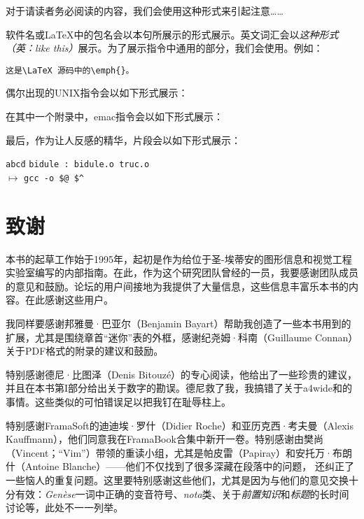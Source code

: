 \begin{exclamation}
对于请读者务必阅读的内容，我们会使用这种形式来引起注意……
\end{exclamation}

\textsf{软件名}或\LaTeX 中的\textsf{包名}会以本句所展示的形式展示。英文词汇会以\emph{这种形式（英：like this）}展示。为了展示指令中通用的部分，我们会使用。例如：

\begin{dmd}
\verb|这是\LaTeX 源码中的\emph{|\verb|}。|
\end{dmd}

偶尔出现的UNIX指令会以如下形式展示：


在其中一个附录中，\textsf{emac}指令会以如下形式展示：


最后，作为让人反感的精华，片段会以如下形式展示：

\begin{mdframed}
\begin{tabbing}
\verb|abcd|\=\kill
\verb|bidule : bidule.o truc.o|\\
$\longmapsto$ \>\verb|gcc -o $@ $^|
\end{tabbing}
\end{mdframed}

\section*{致谢}

本书的起草工作始于1995年，起初是作为给位于圣-埃蒂安的图形信息和视觉工程实验室编写的内部指南。在此，作为这个研究团队曾经的一员，我要感谢团队成员的意见和鼓励。论坛的用户间接地为我提供了大量信息，这些信息丰富乐本书的内容。在此感谢这些用户。

我同样要感谢邦雅曼·巴亚尔（Benjamin Bayart）帮助我创造了一些本书用到的扩展，尤其是围绕章首“迷你”表的外框，感谢纪尧姆·科南（Guillaume Connan）关于PDF格式的附录的建议和鼓励。

特别感谢德尼·比图泽（Denis Bitouzé）的专心阅读，他给出了一些珍贵的建议，并且在本书第I部分给出关于数字的勘误。德尼救了我，我搞错了关于\textsf{a4wide}和的事情。这些类似的可怕错误足以把我钉在耻辱柱上。

特别感谢FramaSoft的迪迪埃·罗什（Didier Roche）和亚历克西·考夫曼（Alexis Kauffmann），他们同意我在FramaBook合集中新开一卷。特别感谢由樊尚（Vincent；“Vim”）带领的重读小组，尤其是帕皮雷（Papiray）和安托万·布朗什（Antoine Blanche）——他们不仅找到了很多深藏在段落中的问题， 还纠正了一些恼人的重复问题。这里要特别感谢这些他们，尤其是因为与他们的意见交换十分有效：\textsl{Genèse}一词中正确的变音符号、\textsl{nota}类、关于\textsl{前置知识}和\textsl{标题}的长时间讨论等，此处不一一列举。

